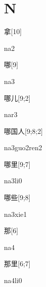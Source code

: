 ﻿%
\section*{N}

\begin{verbete}[na2]{拿}[10]
\begin{pronuncia}{na2}
\end{pronuncia}
\end{verbete}

\begin{verbete}[na3]{哪}[9]
\begin{pronuncia}{na3}
\end{pronuncia}
\end{verbete}

\begin{verbete}[nar3]{哪儿}[9;2]
\begin{pronuncia}{nar3}
\end{pronuncia}
\end{verbete}

\begin{verbete}{哪国人}[9;8;2]
\begin{pronuncia}{na3guo2ren2}
\end{pronuncia}
\end{verbete}

\begin{verbete}[na3li0]{哪里}[9;7]
\begin{pronuncia}{na3li0}
\end{pronuncia}
\end{verbete}

\begin{verbete}[na3xie1]{哪些}[9;8]
\begin{pronuncia}{na3xie1}
\end{pronuncia}
\end{verbete}

\begin{verbete}[na4]{那}[6]
\begin{pronuncia}{na4}
\end{pronuncia}
\end{verbete}

\begin{verbete}[na4li0]{那里}[6;7]
\begin{pronuncia}{na4li0}
\end{pronuncia}
\end{verbete}

